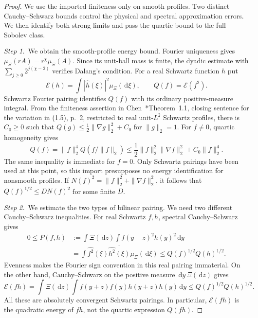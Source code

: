 \documentclass[12pt,oneside,openany]{book}
\numberwithin{equation}{section}
\theoremstyle{nogostyle}
\theoremstyle{definition}
\newcommand{\ud}{\,\mathrm{d}}
\begin{document}
\begin{proof}
  We use the imported finiteness only on smooth profiles. Two distinct
  Cauchy--Schwarz bounds control the physical and spectral approximation
  errors. We then identify both strong limits and pass the quartic bound to
  the full Sobolev class.


  \medskip
  \noindent\textit{Step 1.~}We obtain the smooth-profile energy bound.
  Fourier uniqueness gives $\mu_\Xi(rA) = r^\chi\mu_\Xi(A)$. Since its unit-ball
  mass is finite, the dyadic estimate with $\sum_{j\ge0}2^{j(\chi-2)}$ verifies
  Dalang's condition. For a real Schwartz function $h$ put
  \[
    \mathscr{E}(h)=\int|\widehat{h}(\xi)|^2\mu_\Xi(\ud\xi),
    \qquad Q(f)=\mathscr{E}(f^2).
  \]
  Schwartz Fourier pairing identifies $Q(f)$ with its ordinary positive-measure
  integral. From the finiteness assertion in
  Chen~\cite{chen:23:exponential}*{Theorem~1.1, closing sentence for the
  variation in (1.5), p.~2}, restricted to real unit-$L^2$ Schwartz profiles,
  there is $C_0 \ge 0$ such that $Q(g) \le \frac12\|\nabla g\|_2^2+C_0$ for
  $\|g\|_2 = 1$. For $f \ne 0$, quartic homogeneity gives
  \[
    Q(f)=\|f\|_2^4Q(f/\|f\|_2)
    \le\frac12\|f\|_2^2\|\nabla f\|_2^2+C_0\|f\|_2^4.
  \]
  The same inequality is immediate for $f = 0$. Only Schwartz pairings have been
  used at this point, so this import presupposes no energy identification for
  nonsmooth profiles. If $N(f)^2 = \|f\|_2^2+\|\nabla f\|_2^2$, it follows that
  $Q(f)^{1/2} \le D N(f)^2$ for some finite $D$.


  \medskip
  \noindent\textit{Step 2.~}We estimate the two types of bilinear pairing.
  We need two different Cauchy--Schwarz inequalities. For real Schwartz $f,h$,
  spectral Cauchy--Schwarz gives
  \[
    \begin{split}
      0\le P(f,h)
      &:=\int\Xi(\ud z)\int f(y+z)^2h(y)^2\ud y\\
      &=\int\widehat{f^2}(\xi)
      \overline{\widehat{h^2}(\xi)}\mu_\Xi(\ud\xi)
      \le Q(f)^{1/2}Q(h)^{1/2}.
    \end{split}
  \]
  Evenness makes the Fourier sign convention in this real pairing immaterial. On
  the other hand, Cauchy--Schwarz on the positive measure $\ud y\,\Xi(\ud z)$
  gives
  \[
    \mathscr{E}(fh)
    =\int\Xi(\ud z)\int
    f(y+z)f(y)h(y+z)h(y)\ud y
    \le Q(f)^{1/2}Q(h)^{1/2}.
  \]
  All these are absolutely convergent Schwartz pairings. In particular,
  $\mathscr{E}(fh)$ is the quadratic energy of $fh$, not the quartic expression
  $Q(fh)$.



\end{proof}
\end{document}
